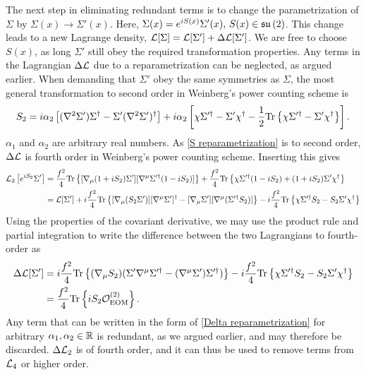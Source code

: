 The next step in eliminating redundant terms is to change the parametrization of $\Sigma$ by $\Sigma(x) \rightarrow \Sigma'(x)$.
Here, $ \Sigma(x) = e^{iS(x)} \Sigma'(x), \, S(x) \in \mathfrak{su}\left(2\right)$. This change leads to a new Lagrange density, $\mathcal{L}[\Sigma] = \mathcal{L}[\Sigma'] + \Delta \mathcal{L}[\Sigma']$.
We are free to choose $S(x)$, as long $\Sigma'$ still obey the required transformation properties.
Any terms in the Lagrangian $\Delta \mathcal{L}$ due to a reparametrization can be neglected, as argued earlier.
When demanding that $\Sigma'$ obey the same symmetries as $\Sigma$,
the most general transformation to second order in Weinberg's power counting scheme  is~\cite{schererIntroductionChiralPerturbation2002}
%
\begin{equation}
    \label{S reparametrization}
    S_{2} = 
    i \alpha_2 
    \left[
        (\nabla^2 \Sigma') \Sigma^\dagger - \Sigma' (\nabla^2 {\Sigma'})^\dagger
    \right]
    + i \alpha_2
    \left[
        \chi \Sigma'^\dagger - \Sigma' \chi^\dagger 
        - \frac{1}{2} \text{Tr} \left\{ \chi \Sigma'^\dagger - \Sigma' \chi^\dagger \right\}
    \right].
\end{equation}
%
$\alpha_1$ and $\alpha_2$ are arbitrary real numbers. As \autoref{S reparametrization} is to second order, $\Delta \mathcal{L}$ is fourth order in Weinberg's power counting scheme.
Inserting this gives
%
\begin{align*}
    \mathcal{L}_2\left[e^{i S_2}\Sigma '\right]
    & =
    \frac{f^2}{4}\text{Tr} \left\{ [\nabla_\mu (1 +i S_2)\Sigma'][\nabla^\mu \Sigma'^\dagger  (1 - i S_2)] \right\}
    + \frac{f^2}{4} \text{Tr} \left\{ \chi\Sigma'^\dagger (1 - i S_2) + (1 +i S_2)\Sigma' \chi^\dagger \right\} \\
    & = \mathcal{L}[\Sigma'] + 
    i \frac{f^2}{4}
    \text{Tr} \left\{ [\nabla_\mu (S_2\Sigma')][\nabla^\mu\Sigma']^\dagger 
    -  [\nabla_\mu\Sigma'][\nabla^\mu (\Sigma'^\dagger  S_2) ] \right\}
    - i \frac{f^2}{4} \text{Tr} \left\{ \chi \Sigma'^\dagger S_2 - S_2 \Sigma' \chi^\dagger \right\}
\end{align*}
%
Using the properties of the covariant derivative, we may use the product rule and partial integration to write the difference between the two Lagrangians to fourth-order as
%
\begin{align}
    \nonumber
    \Delta \mathcal{L}[\Sigma'] 
    & = 
    i \frac{f^2}{4}
    \text{Tr} \left\{ 
        (\nabla_\mu S_2)
        (\Sigma' \nabla^\mu \Sigma'^\dagger - (\nabla^\mu \Sigma') \Sigma'^\dagger) 
     \right\}
    - i \frac{f^2}{4} \text{Tr} \left\{ \chi \Sigma'^\dagger  S_2 - S_2 \Sigma' \chi^\dagger \right\} \\
    & = 
    \label{Delta reparametrization}
    \frac{f^2}{4} \text{Tr} \left\{ i S_2 \mathcal{O}_\mathrm{EOM}^{(2)} \right\}.
\end{align}
%
Any term that can be written in the form of \autoref{Delta reparametrization} for arbitrary $\alpha_1, \alpha_2 \in \mathbb{R}$ is redundant, as we argued earlier, and may therefore be discarded.
$\Delta \mathcal{L}_2$ is of fourth order, and it can thus be used to remove terms from $\mathcal{L}_4$ or higher order.



